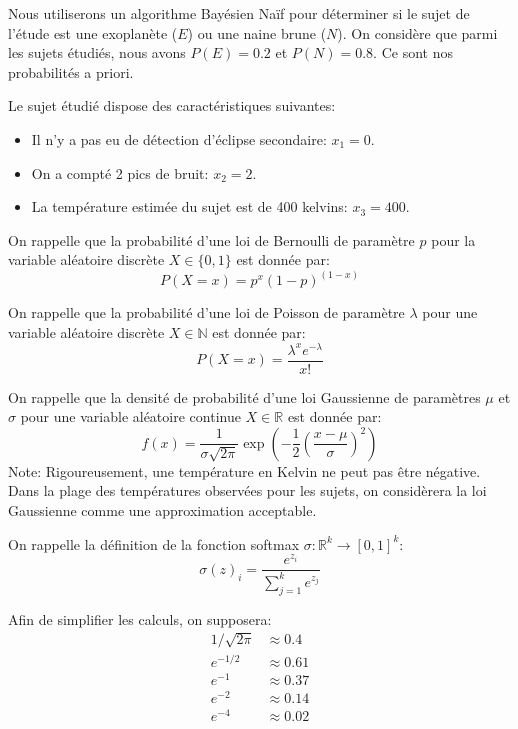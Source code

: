 \documentclass[solutions]{../exercices}
\begin{document}
\begin{exercice}
		Nous utiliserons un algorithme Bayésien Naïf pour déterminer si le sujet de l'étude est une exoplanète ($E$) ou une naine brune ($N$). On considère que parmi les sujets étudiés, nous avons $P(E) = 0.2$ et $P(N) = 0.8$. Ce sont nos probabilités a priori.

		Le sujet étudié dispose des caractéristiques suivantes:
		\begin{itemize}
			\item Il n'y a pas eu de détection d'éclipse secondaire: $x_1 = 0$.
			\item On a compté 2 pics de bruit: $x_2 = 2$.
			\item La température estimée du sujet est de 400 kelvins: $x_3 = 400$.
		\end{itemize}

		On rappelle que la probabilité d'une loi de Bernoulli de paramètre $p$ pour la variable aléatoire discrète $X \in \{0, 1\}$ est donnée par:
		\begin{equation}
			P(X = x) = p^x \left(1 - p\right)^{\left(1 - x\right)}
			\nonumber
		\end{equation}

		On rappelle que la probabilité d'une loi de Poisson de paramètre $\lambda$ pour une variable aléatoire discrète $X \in \mathbb{N}$ est donnée par:
		\begin{equation}
			P(X = x) = \frac{\lambda^x e^{-\lambda}}{x!}
			\nonumber
		\end{equation}

		On rappelle que la densité de probabilité d'une loi Gaussienne de paramètres $\mu$ et $\sigma$ pour une variable aléatoire continue $X \in \mathbb{R}$ est donnée par:
		\begin{equation}
			f(x) = \frac{1}{\sigma \sqrt{2 \pi}} \exp{\left(-\frac{1}{2} \left(\frac{x - \mu}{\sigma}\right)^2\right)}
			\nonumber
		\end{equation}
		Note: Rigoureusement, une température en Kelvin ne peut pas être négative. Dans la plage des températures observées pour les sujets, on considèrera la loi Gaussienne comme une approximation acceptable.

		On rappelle la définition de la fonction softmax $\sigma: \mathbb{R}^k \to [0, 1]^k$:
		\begin{equation}
			\sigma(z)_i = \frac{e^{z_i}}{\sum_{j=1}^k e^{z_j}}
			\nonumber
		\end{equation}

		Afin de simplifier les calculs, on supposera:
		\begin{equation}
			\begin{aligned}
				1 / \sqrt{2 \pi} &\approx 0.4 \\
				e^{-1/2} &\approx 0.61 \\
				e^{-1} &\approx 0.37 \\
				e^{-2} &\approx 0.14 \\
				e^{-4} &\approx 0.02
			\end{aligned}
			\nonumber
		\end{equation}


\end{exercice}
\end{document}
